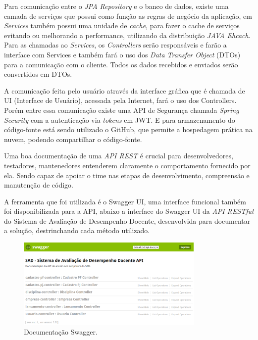     Para comunicação entre o \textit{JPA Repository} e o banco de dados, existe uma camada de serviços que possui como função as regras de negócio da aplicação, em \textit{Services} também possui uma unidade de \textit{cache}, para fazer o cache de serviços evitando ou melhorando a performance, utilizando da distribuição \textit{JAVA Ehcach}. Para as chamadas ao \textit{Services}, os \textit{Controllers} serão responsáveis e farão a interface com Services e também fará o uso dos \textit{Data Transfer Object} (DTOs) para a comunicação com o cliente. Todos os dados recebidos e enviados serão convertidos em DTOs.
    
    A comunicação feita pelo usuário através da interface gráfica que é chamada de UI (Interface de Usuário), acessada pela Internet, fará o uso dos Controllers. Porém entre essa comunicação existe uma API de Segurança chamada \textit{Spring Security} com a autenticação via \textit{tokens} em JWT. E para armazenamento do código-fonte está sendo utilizado o GitHub,  que permite a hospedagem prática na nuvem, podendo compartilhar o código-fonte.

   Uma boa documentação de uma \textit{API REST} é crucial para desenvolvedores, testadores, mantenedores entenderem claramente o comportamento fornecido por ela. Sendo capaz de apoiar o time nas etapas de desenvolvimento, compreensão e manutenção de código. 
    
    A ferramenta que foi utilizada é o Swagger UI, uma interface funcional também foi disponibilizada para a API, abaixo a interface do Swagger UI da \textit{API RESTful} do Sistema de Avaliação de Desempenho Docente, desenvolvida para documentar a solução, destrinchando cada método utilizado.

    
    \begin{figure}[h]
    \centering
    \includegraphics[width=0.81\textwidth]{./img/Swagger.png}
    \caption{Documentação Swagger.}
    \label{fig:Swagger}
    \end{figure}

